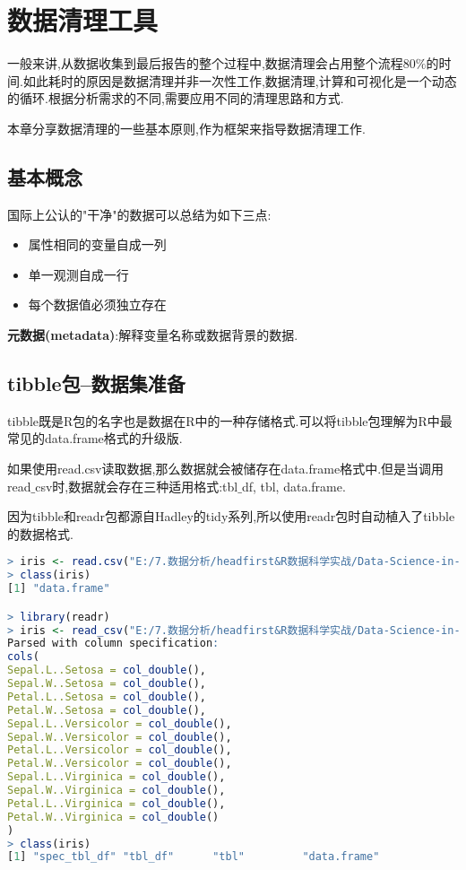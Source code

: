 \documentclass[11pt,a4paper,oneside]{book}
\begin{document}
\chapter{数据清理工具}
一般来讲,从数据收集到最后报告的整个过程中,数据清理会占用整个流程$ 80\% $的时间.如此耗时的原因是数据清理并非一次性工作,数据清理,计算和可视化是一个动态的循环.根据分析需求的不同,需要应用不同的清理思路和方式.

本章分享数据清理的一些基本原则,作为框架来指导数据清理工作.

\section{基本概念}
国际上公认的"干净"的数据可以总结为如下三点:
\begin{itemize}
	\item 属性相同的变量自成一列
	\item 单一观测自成一行
	\item 每个数据值必须独立存在
\end{itemize}

\textbf{元数据(metadata)}:解释变量名称或数据背景的数据.

\section{tibble包--数据集准备}
tibble既是R包的名字也是数据在R中的一种存储格式.可以将tibble包理解为R中最常见的data.frame格式的升级版.

如果使用read.csv读取数据,那么数据就会被储存在data.frame格式中.但是当调用read$ \_ $csv时,数据就会存在三种适用格式:tbl$ \_ $df, tbl, data.frame.

因为tibble和readr包都源自Hadley的tidy系列,所以使用readr包时自动植入了tibble的数据格式.
\begin{lstlisting}[language=r]
> iris <- read.csv("E:/7.数据分析/headfirst&R数据科学实战/Data-Science-in-Action-R-Tools-and-Case-Studies-master/chapter2/RawData/iris.csv",stringsAsFactors = F)
> class(iris)
[1] "data.frame"

> library(readr)
> iris <- read_csv("E:/7.数据分析/headfirst&R数据科学实战/Data-Science-in-Action-R-Tools-and-Case-Studies-master/chapter2/RawData/iris.csv")
Parsed with column specification:
cols(
Sepal.L..Setosa = col_double(),
Sepal.W..Setosa = col_double(),
Petal.L..Setosa = col_double(),
Petal.W..Setosa = col_double(),
Sepal.L..Versicolor = col_double(),
Sepal.W..Versicolor = col_double(),
Petal.L..Versicolor = col_double(),
Petal.W..Versicolor = col_double(),
Sepal.L..Virginica = col_double(),
Sepal.W..Virginica = col_double(),
Petal.L..Virginica = col_double(),
Petal.W..Virginica = col_double()
)
> class(iris)
[1] "spec_tbl_df" "tbl_df"      "tbl"         "data.frame"
\end{lstlisting}
\end{document}
